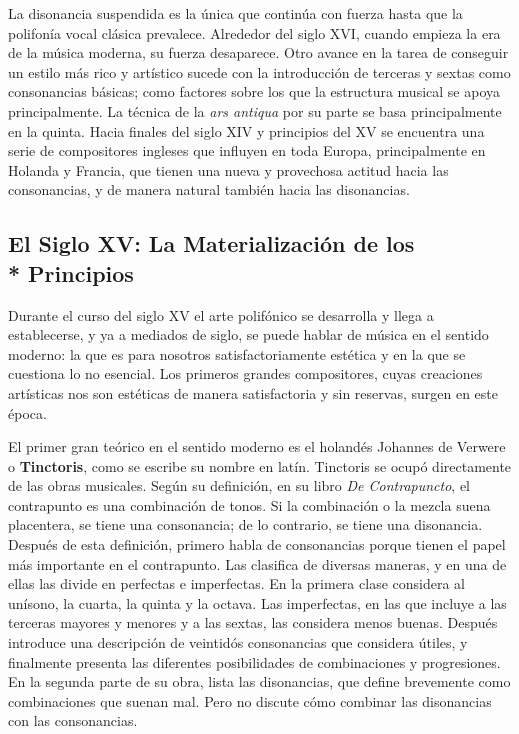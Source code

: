 \documentclass[letterpaper,12pt]{book}
\theoremstyle{definition} \newtheorem{Def}{Definición}[chapter]
\theoremstyle{definition} \newtheorem{Teo}{Teorema}[chapter]
\theoremstyle{definition} \newtheorem{Pro}{Proposición}[chapter]
\theoremstyle{definition} \newtheorem{Lema}{Lema}[chapter]
\begin{document}
La disonancia suspendida es la única que continúa con fuerza hasta que la polifonía vocal clásica prevalece. Alrededor del siglo XVI, cuando empieza la era de la música moderna, su fuerza desaparece. Otro avance en la tarea de conseguir un estilo más rico y artístico sucede con la introducción de terceras y sextas como consonancias básicas; como factores sobre los que la estructura musical se apoya principalmente. La técnica de la \emph{ars antiqua} por su parte se basa principalmente en la quinta. Hacia finales del siglo XIV y principios del XV se encuentra una serie de compositores ingleses que influyen en toda Europa, principalmente en Holanda y Francia, que tienen una nueva y provechosa actitud hacia las consonancias, y de manera natural también hacia las disonancias. 

\subsection[El Siglo XV: La Materialización de los Principios]{El Siglo XV: La Materialización de los\\* Principios}

Durante el curso del siglo XV el arte polifónico se desarrolla y llega a establecerse, y ya a mediados de siglo, se puede hablar de música en el sentido moderno: la que es para nosotros satisfactoriamente estética y en la que se cuestiona lo no esencial. Los primeros grandes compositores, cuyas creaciones artísticas nos son estéticas de manera satisfactoria y sin reservas, surgen en este época.

El primer gran  teórico en el sentido moderno es el holandés Johannes de Verwere o \textbf{Tinctoris}, como se escribe su nombre en latín. Tinctoris se ocupó directamente de las obras musicales. Según su definición, en su libro \emph{De Contrapuncto}, el contrapunto es una combinación de tonos. Si la combinación o la mezcla suena placentera, se tiene una consonancia; de lo contrario, se tiene una disonancia. Después de esta definición, primero habla de consonancias porque tienen el papel más importante en el contrapunto. Las clasifica de diversas maneras, y en una de ellas las divide en perfectas e imperfectas. En la primera clase considera al unísono, la cuarta, la quinta y la octava. Las imperfectas, en las que incluye a las terceras mayores y menores y a las sextas, las considera menos buenas. Después introduce una descripción de veintidós consonancias que considera útiles, y finalmente presenta las diferentes posibilidades de combinaciones y progresiones. En la segunda parte de su obra, lista las disonancias, que define brevemente como combinaciones que suenan mal. Pero no discute cómo combinar las disonancias con las consonancias.
\end{document}
